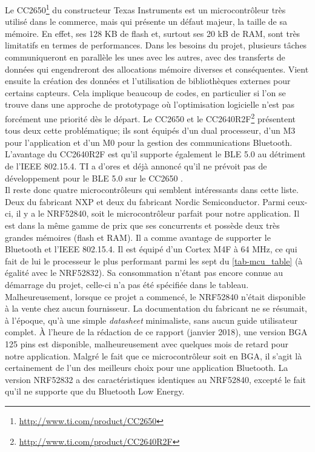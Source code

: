 Le CC2650\footnote{\url{http://www.ti.com/product/CC2650}} du constructeur Texas Instruments est un microcontrôleur très utilisé dans le commerce, mais qui présente un défaut majeur, la taille de sa mémoire. En effet, ses 128 KB de flash et, surtout ses 20 kB de RAM, sont très limitatifs en termes de performances. Dans les besoins du projet, plusieurs tâches communiqueront en parallèle les unes avec les autres, avec des transferts de données qui engendreront des allocations mémoire diverses et conséquentes. Vient ensuite la création des données et l'utilisation de bibliothèques externes pour certains capteurs. Cela implique beaucoup de codes, en particulier si l'on se trouve dans une approche de prototypage où l'optimisation logicielle n'est pas forcément une priorité dès le départ. Le CC2650 et le CC2640R2F\footnote{\url{http://www.ti.com/product/CC2640R2F}} présentent tous deux cette problématique; ils sont équipés d'un dual processeur, d'un M3 pour l'application et d'un M0 pour la gestion des communications Bluetooth. L'avantage du CC2640R2F est qu'il supporte également le BLE 5.0 au détriment de l'IEEE 802.15.4. TI a d'ores et déjà annoncé qu'il ne prévoit pas de développement pour le BLE 5.0 sur le CC2650 \cite{CC2650Bl25:online}.\\

Il reste donc quatre microcontrôleurs qui semblent intéressants dans cette liste. Deux du fabricant NXP et deux du fabricant Nordic Semiconductor. Parmi ceux-ci, il y a le NRF52840, soit le microcontrôleur parfait pour notre application. Il est dans la même gamme de prix que ses concurrents et possède deux très grandes mémoires (flash et RAM). Il a comme avantage de supporter le Bluetooth et l'IEEE 802.15.4. Il est équipé d'un Cortex M4F à 64 MHz, ce qui fait de lui le processeur le plus performant parmi les sept du \cref{tab-mcu_table} (à égalité avec le NRF52832). Sa consommation n'étant pas encore connue au démarrage du projet, celle-ci n'a pas été spécifiée dans le tableau. Malheureusement, lorsque ce projet a commencé, le NRF52840 n'était disponible à la vente chez aucun fournisseur. La documentation du fabricant ne se résumait, à l'époque, qu'à une simple \textit{datasheet} minimaliste, sans aucun guide utilisateur complet. À l'heure de la rédaction de ce rapport (janvier 2018), une version BGA 125 pins est disponible, malheureusement avec quelques mois de retard pour notre application. Malgré le fait que ce microcontrôleur soit en BGA, il s'agit là certainement de l'un des meilleurs choix pour une application Bluetooth. La version NRF52832 a des caractéristiques identiques au NRF52840, excepté le fait qu'il ne supporte que du Bluetooth Low Energy.\\

